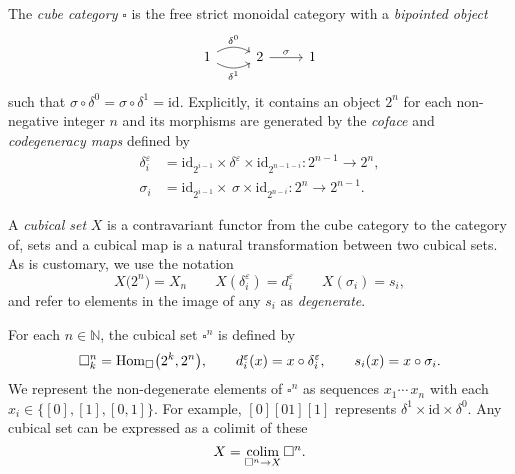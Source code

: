 The \textit{cube category} $\square$ is the free strict monoidal category with a \textit{bipointed object}
\begin{equation*}
\begin{tikzcd}
1 \arrow[r, bend left, "\delta^0"] \arrow[r, bend right, "\delta^1"'] & 2 \arrow[r, "\sigma"] & 1
\end{tikzcd}
\end{equation*}
such that $\sigma \circ \delta^0 = \sigma \circ \delta^1 = \mathrm{id}$.
Explicitly, it contains an object $2^n$ for each non-negative integer $n$ and its morphisms are generated by the \textit{coface} and \textit{codegeneracy maps} defined by
\begin{align*}
\delta_i^\varepsilon & = \mathrm{id}_{2^{i-1}} \times \delta^\varepsilon \times \mathrm{id}_{2^{n-1-i}} \colon 2^{n-1} \to 2^n, \\
\sigma_i & = \mathrm{id}_{2^{i-1}} \times \, \sigma \times \mathrm{id}_{2^{n-i}} \colon 2^{n} \to 2^{n-1}.
\end{align*}

A \textit{cubical set} $X$ is a contravariant functor from the cube category to the category of, sets and a cubical map is a natural transformation between two cubical sets.
As is customary, we use the notation
\begin{equation*}
X\big( 2^n \big) = X_n \qquad X(\delta^\varepsilon_i) = d^\varepsilon_i \qquad X(\sigma_i) = s_i,
\end{equation*}
and refer to elements in the image of any $s_i$ as \textit{degenerate}.

For each $n \in \mathbb{N}$, the cubical set $\square^n$ is defined by
\begin{equation*}
\square^n_k  = \mathrm{Hom}_{\square} \big( 2^k, 2^n \big), \qquad 
d^\varepsilon_i(x) = x \circ \delta^\varepsilon_i, \qquad 
s_i(x) = x \circ \sigma_i.
\end{equation*}
We represent the non-degenerate elements of $\square^n$ as sequences $x_1 \cdots\, x_n$ with each $x_i \in \big\{[0], [1], [0,1]\big\}$.
For example, $[0][01][1]$ represents $\delta^1 \times \mathrm{id} \times \delta^0$.
Any cubical set can be expressed as a colimit of these
\begin{equation*}
X = \operatorname*{colim}_{\square^n \to X} \square^n.
\end{equation*}

